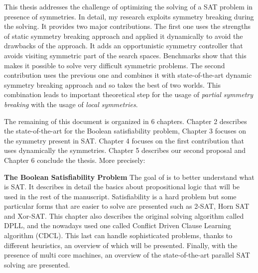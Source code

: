 %
%
%
This thesis addresses the challenge of optimizing the solving of a SAT problem in presence of
symmetries. In detail, my research exploits symmetry breaking during the solving.
It provides two major contributions. The first one uses the strengths of static symmetry 
breaking approach and applied it dynamically to avoid the drawbacks of the approach. 
It adds an opportunistic symmetry controller that avoids visiting symmetric part of the search spaces.
 Benchmarks show that this makes it possible to solve very difficult symmetric problems.
The second contribution uses the previous one and combines it with state-of-the-art dynamic 
symmetry breaking approach and so takes the best of two worlds. This combination leads to 
important theoretical step for the usage of \emph{partial symmetry breaking} with the usage of 
\emph{local symmetries}. 
 
The remaining of this document is organized in 6 chapters. Chapter 2 describes the state-of-the-art
 for the Boolean satisfiability problem, Chapter 3 focuses on the symmetry present in SAT.
Chapter 4 focuses on the first contribution that uses dynamically the symmetries.
Chapter 5 describes our second proposal and Chapter 6 conclude the thesis. More precisely:
 
\textbf{The Boolean Satisfiability Problem}
The goal of  is to better understand what is SAT. 
It describes in detail the basics
about propositional logic that will be used in the rest of the manuscript. Satisfiability is a hard
problem but some particular forms that are easier to solve are presented such as 2-SAT, Horn SAT and Xor-SAT.
This chapter also describes the original solving algorithm called DPLL, and the
nowadays used one called Conflict Driven Clause Learning algorithm (CDCL).
This last can handle sophisticated problems, thanks to different heuristics, 
an overview of which will be presented. Finally, with the presence of multi
core machines, an overview of the state-of-the-art parallel SAT solving are presented.

